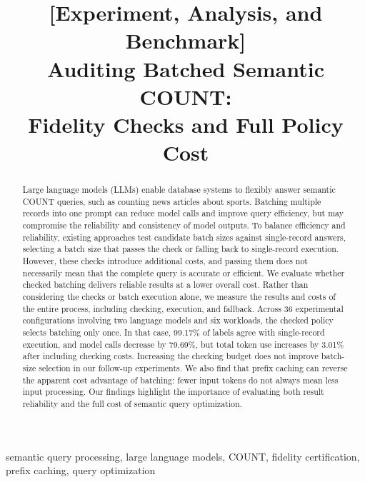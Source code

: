 \documentclass[conference]{IEEEtran}
\begin{document}
\title{[Experiment, Analysis, and Benchmark]\\Auditing Batched Semantic COUNT:\\Fidelity Checks and Full Policy Cost}

\maketitle
\begin{abstract}
Large language models (LLMs) enable database systems to flexibly answer semantic COUNT queries, such as counting news articles about sports. Batching multiple records into one prompt can reduce model calls and improve query efficiency, but may compromise the reliability and consistency of model outputs. To balance efficiency and reliability, existing approaches test candidate batch sizes against single-record answers, selecting a batch size that passes the check or falling back to single-record execution. However, these checks introduce additional costs, and passing them does not necessarily mean that the complete query is accurate or efficient. We evaluate whether checked batching delivers reliable results at a lower overall cost. Rather than considering the checks or batch execution alone, we measure the results and costs of the entire process, including checking, execution, and fallback. Across 36 experimental configurations involving two language models and six workloads, the checked policy selects batching only once. In that case, 99.17\% of labels agree with single-record execution, and model calls decrease by 79.69\%, but total token use increases by 3.01\% after including checking costs. Increasing the checking budget does not improve batch-size selection in our follow-up experiments. We also find that prefix caching can reverse the apparent cost advantage of batching: fewer input tokens do not always mean less input processing. Our findings highlight the importance of evaluating both result reliability and the full cost of semantic query optimization.
\end{abstract}
\begin{IEEEkeywords}
semantic query processing, large language models, COUNT, fidelity certification, prefix caching, query optimization
\end{IEEEkeywords}











\label{body:end}
\clearpage
{}

\clearpage

\end{document}
